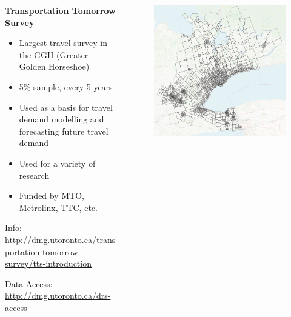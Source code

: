 \documentclass[aspectratio=169]{beamer}
\begin{document}
\begin{frame}
	
		\begin{columns}
		\begin{column}{0.5\textwidth}
			\textbf{Transportation Tomorrow Survey}
			\begin{itemize}
				\item Largest travel survey in the GGH (Greater Golden Horseshoe)
				\item 5\% sample, every 5 years
				\item Used as a basis for travel demand modelling and forecasting future travel demand
				\item Used for a variety of research
				\item Funded by MTO, Metrolinx, TTC, etc.
			\end{itemize}
		
		\tiny Info: \url{http://dmg.utoronto.ca/transportation-tomorrow-survey/tts-introduction}
		
		\vspace{2mm}
		
		\tiny Data Access: \url{http://dmg.utoronto.ca/drs-access}
			
		\end{column}
		
		\begin{column}{0.5\textwidth}
			
			\begin{figure}
				\centering
				\includegraphics[width=1\linewidth]{images/tts_region.png}
			\end{figure}
			
			
		\end{column}
		
	\end{columns}
	
\end{frame}
\end{document}

